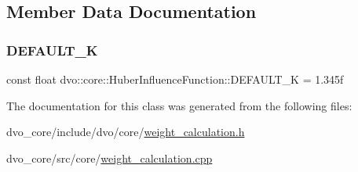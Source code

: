 \subsection{Member Data Documentation}
\mbox{\label{classdvo_1_1core_1_1_huber_influence_function_a7298db77700e394a56fafbf20da229fc}} 
\subsubsection{\texorpdfstring{D\+E\+F\+A\+U\+L\+T\+\_\+K}{DEFAULT\_K}}
{\footnotesize\ttfamily const float dvo\+::core\+::\+Huber\+Influence\+Function\+::\+D\+E\+F\+A\+U\+L\+T\+\_\+K = 1.\+345f\hspace{0.3cm}{\ttfamily [static]}}



The documentation for this class was generated from the following files\+:\begin{DoxyCompactItemize}
\item 
dvo\+\_\+core/include/dvo/core/\mbox{\hyperlink{weight__calculation_8h}{weight\+\_\+calculation.\+h}}\item 
dvo\+\_\+core/src/core/\mbox{\hyperlink{weight__calculation_8cpp}{weight\+\_\+calculation.\+cpp}}\end{DoxyCompactItemize}
